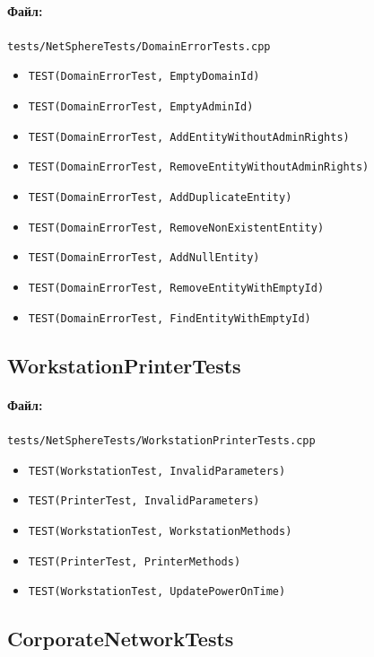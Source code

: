\documentclass[14pt,a4paper]{extarticle}
\begin{document}
\paragraph{Файл:} \texttt{tests/NetSphereTests/DomainErrorTests.cpp}
\begin{itemize}
  \item \texttt{TEST(DomainErrorTest, EmptyDomainId)}
  \item \texttt{TEST(DomainErrorTest, EmptyAdminId)}
  \item \texttt{TEST(DomainErrorTest, AddEntityWithoutAdminRights)}
  \item \texttt{TEST(DomainErrorTest, RemoveEntityWithoutAdminRights)}
  \item \texttt{TEST(DomainErrorTest, AddDuplicateEntity)}
  \item \texttt{TEST(DomainErrorTest, RemoveNonExistentEntity)}
  \item \texttt{TEST(DomainErrorTest, AddNullEntity)}
  \item \texttt{TEST(DomainErrorTest, RemoveEntityWithEmptyId)}
  \item \texttt{TEST(DomainErrorTest, FindEntityWithEmptyId)}
\end{itemize}

\subsection{WorkstationPrinterTests}
\paragraph{Файл:} \texttt{tests/NetSphereTests/WorkstationPrinterTests.cpp}
\begin{itemize}
  \item \texttt{TEST(WorkstationTest, InvalidParameters)}
  \item \texttt{TEST(PrinterTest, InvalidParameters)}
  \item \texttt{TEST(WorkstationTest, WorkstationMethods)}
  \item \texttt{TEST(PrinterTest, PrinterMethods)}
  \item \texttt{TEST(WorkstationTest, UpdatePowerOnTime)}
\end{itemize}

\subsection{CorporateNetworkTests}
\end{document}
